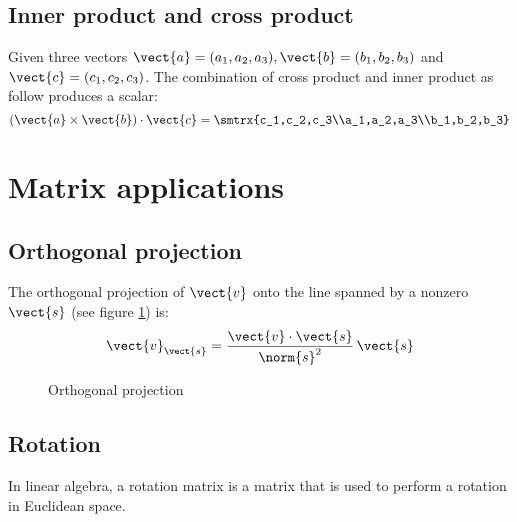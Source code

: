 \subsection{Inner product and cross product}
Given three vectors $\vect{a}=(a_1,a_2,a_3),\vect{b}=(b_1,b_2,b_3)$ and $\vect{c}=(c_1,c_2,c_3)$. The combination of cross product and inner product as follow produces a scalar:
\begin{equation}
\left( \vect{a}\times\vect{b} \right)\cdot\vect{c}=\smtrx{c_1,c_2,c_3\\a_1,a_2,a_3\\b_1,b_2,b_3}
\end{equation}

\section{Matrix applications}
\subsection{Orthogonal projection}
The orthogonal projection of $\vect{v}$ onto the line spanned by a nonzero $\vect{s}$ (see figure \ref{Linalg_projection}) is: 
\[ \vect{v}_{\vect{s}}=\frac{\vect{v}\cdot\vect{s}}{\norm{s}^2} \, \vect{s} \]

\begin{figure}[hbtp]
\caption{Orthogonal projection}
\label{Linalg_projection}
\centering
\end{figure}

\subsection{Rotation}
In linear algebra, a rotation matrix is a matrix that is used to perform a rotation in Euclidean space.
